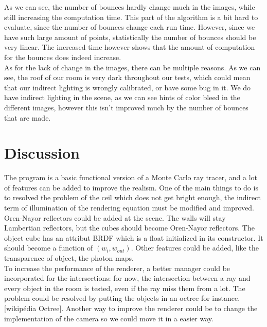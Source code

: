 \documentclass[12pt]{article}
\numberwithin{equation}{section}
\begin{document}
 As we can see, the number of bounces hardly change much in the images, while still increasing the computation time. This part of the algorithm is a bit hard to evaluate, since the number of bounces change each run time. However, since we have such large amount of points, statistically the number of bounces should be very linear. The increased time however shows that the amount of computation for the bounces does indeed increase. \\
 
As for the lack of change in the images, there can be multiple reasons. As we can see, the roof of our room is very dark throughout our tests, which could mean that our indirect lighting is wrongly calibrated, or have some bug in it. We do have indirect lighting in the scene, as we can see hints of color bleed in the different images, however this isn't improved much by the number of bounces that are made.
 

\section{Discussion}


The program is a basic functional version of a Monte Carlo ray tracer, and a lot of features can be added to improve the realism. One of the main things to do is to resolved the problem of the ceil which does not get bright enough, the indirect term of illumination of the rendering equation must be modified and improved. Oren-Nayor reflectors could be added at the scene. The walls will stay Lambertian reflectors, but the cubes should become Oren-Nayor reflectors. The object cube has an attribut BRDF which is a float initialized in its constructor. It should become a function of $(w_i, w_{out})$. Other features could be added, like the transparence of object, the photon maps. \\	To increase the performance of the renderer, a better manager could be incorporated for the intersections: for now, the intersection between a ray and every object in the room is tested, even if the ray miss them from a lot. The problem could be resolved by putting the objects in an octree for instance.[wikipédia Octree]. Another way to improve the renderer could be to change the implementation of the camera so we could move it in a easier way.
\end{document}
